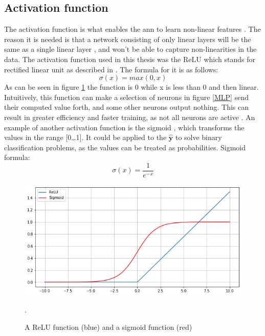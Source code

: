     \subsection{Activation function} \label{activation function}
        The activation function is what enables the \gls{ann} to learn non-linear features \cite{razavi2021deep_exp_per}. The reason it is needed is that a network consisting of only linear layers will be the same as a single linear layer \cite{razavi2021deep_exp_per}, and won't be able to capture non-linearities in the data. The activation function used in this thesis was the ReLU which stands for rectified linear unit as described in \cite{sharma2019new_activation_func}. The formula for it is as follows:
            \begin{equation} \label{relu_eq}
                \sigma(x) = max(0,x)
            \end{equation}
        As can be seen in figure \ref{activation_fig} the function is 0 while x is less than 0 and then linear. Intuitively, this function can make a selection of neurons in figure \ref{MLP} send their computed value forth, and some  other neurons output nothing. This can result in greater efficiency and faster training, as not all neurons are active \cite{sharma2019new_activation_func}. An example of another activation function is the sigmoid \cite{sharma2019new_activation_func}, which transforms the values in the range [0…1]. It could be applied to the $\hat{\textbf{y}}$ to solve binary classification problems, as the values can be treated as probabilities. Sigmoid formula:
            \begin{equation} \label{sigmoid_eq}
                \sigma(x) = \dfrac{1}{e^{-x}} 
            \end{equation}
            
            \begin{figure}[H]
                \centering
                \includegraphics[scale=0.5]{figures/activation.png}
                \caption[ReLu and sigmoid]{A ReLU function (blue) and a sigmoid function (red)}.
              	\medskip 
                \label{activation_fig}
            \end{figure}
            
